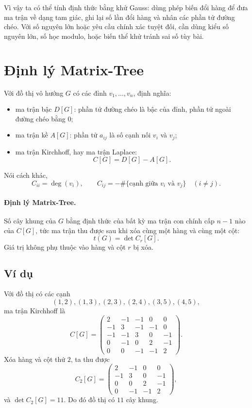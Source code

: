 \documentclass[11pt]{article}
\newcommand{\mat}[1]{\begin{pmatrix}#1\end{pmatrix}}
\begin{document}
Vì vậy ta có thể tính định thức bằng khử Gauss: dùng phép biến đổi hàng để
đưa ma trận về dạng tam giác, ghi lại số lần đổi hàng và nhân các phần tử
đường chéo. Với số nguyên lớn hoặc yêu cầu chính xác tuyệt đối, cần dùng kiểu
số nguyên lớn, số học modulo, hoặc biến thể khử tránh sai số tùy bài.

\section{Định lý Matrix-Tree}

Với đồ thị vô hướng \(G\) có các đỉnh \(v_1,\ldots,v_n\), định nghĩa:
\begin{itemize}
  \item ma trận bậc \(D[G]\): phần tử đường chéo là bậc của đỉnh, phần tử
  ngoài đường chéo bằng \(0\);
  \item ma trận kề \(A[G]\): phần tử \(a_{ij}\) là số cạnh nối \(v_i\) và
  \(v_j\);
  \item ma trận Kirchhoff, hay ma trận Laplace:
  \[
    C[G]=D[G]-A[G].
  \]
\end{itemize}
Nói cách khác,
\[
  C_{ii}=\deg(v_i),\qquad
  C_{ij}=-\#\{\text{cạnh giữa }v_i\text{ và }v_j\}\quad(i\ne j).
\]

\paragraph{Định lý Matrix-Tree.}
Số cây khung của \(G\) bằng định thức của bất kỳ ma trận con chính cấp
\(n-1\) nào của \(C[G]\), tức ma trận thu được sau khi xóa cùng một hàng và
cùng một cột:
\[
  t(G)=\det C_r[G].
\]
Giá trị không phụ thuộc vào hàng và cột \(r\) bị xóa.

\subsection{Ví dụ}

Với đồ thị có các cạnh
\[
  (1,2),(1,3),(2,3),(2,4),(3,5),(4,5),
\]
ma trận Kirchhoff là
\[
  C[G]=
  \mat{
   2&-1&-1& 0& 0\\
  -1& 3&-1&-1& 0\\
  -1&-1& 3& 0&-1\\
   0&-1& 0& 2&-1\\
   0& 0&-1&-1& 2
  }.
\]
Xóa hàng và cột thứ \(2\), ta thu được
\[
  C_2[G]=
  \mat{
   2&-1& 0& 0\\
  -1& 3& 0&-1\\
   0& 0& 2&-1\\
   0&-1&-1& 2
  },
\]
và \(\det C_2[G]=11\). Do đó đồ thị có \(11\) cây khung.
\end{document}
